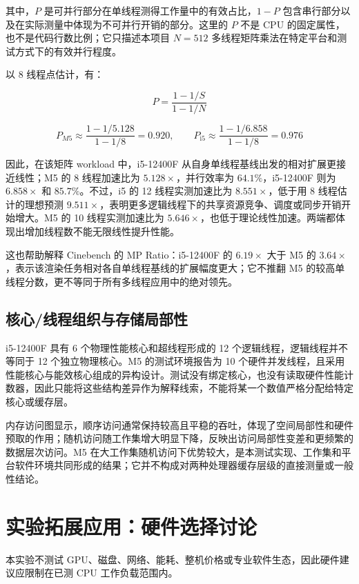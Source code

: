 \documentclass[UTF8,a4paper,12pt]{ctexart}
\begin{document}
其中，$P$ 是可并行部分在单线程测得工作量中的有效占比，$1-P$ 包含串行部分以及在实际测量中体现为不可并行开销的部分。这里的 $P$ 不是 CPU 的固定属性，也不是代码行数比例；它只描述本项目 $N=512$ 多线程矩阵乘法在特定平台和测试方式下的有效并行程度。

以 8 线程点估计，有：

\[
P=\frac{1-1/S}{1-1/N}
\]

\[
P_{M5}\approx\frac{1-1/5.128}{1-1/8}=0.920,
\qquad
P_{\mathrm{i5}}\approx\frac{1-1/6.858}{1-1/8}=0.976
\]

因此，在该矩阵 workload 中，i5-12400F 从自身单线程基线出发的相对扩展更接近线性；M5 的 8 线程加速比为 $5.128\times$，并行效率为 $64.1\%$，i5-12400F 则为 $6.858\times$ 和 $85.7\%$。不过，i5 的 12 线程实测加速比为 $8.551\times$，低于用 8 线程估计的理想预测 $9.511\times$，表明更多逻辑线程下的共享资源竞争、调度或同步开销开始增大。M5 的 10 线程实测加速比为 $5.646\times$，也低于理论线性加速。两端都体现出增加线程数不能无限线性提升性能。

这也帮助解释 Cinebench 的 MP Ratio：i5-12400F 的 $6.19\times$ 大于 M5 的 $3.64\times$，表示该渲染任务相对各自单线程基线的扩展幅度更大；它不推翻 M5 的较高单线程分数，更不等同于所有多线程应用中的绝对领先。

\subsection{核心/线程组织与存储局部性}

i5-12400F 具有 6 个物理性能核心和超线程形成的 12 个逻辑线程，逻辑线程并不等同于 12 个独立物理核心。M5 的测试环境报告为 10 个硬件并发线程，且采用性能核心与能效核心组成的异构设计。测试没有绑定核心，也没有读取硬件性能计数器，因此只能将这些结构差异作为解释线索，不能将某一个数值严格分配给特定核心或缓存层。

内存访问图显示，顺序访问通常保持较高且平稳的吞吐，体现了空间局部性和硬件预取的作用；随机访问随工作集增大明显下降，反映出访问局部性变差和更频繁的数据层次访问。M5 在大工作集随机访问下优势较大，是本测试实现、工作集和平台软件环境共同形成的结果；它并不构成对两种处理器缓存层级的直接测量或一般性结论。

\section{实验拓展应用：硬件选择讨论}

本实验不测试 GPU、磁盘、网络、能耗、整机价格或专业软件生态，因此硬件建议应限制在已测 CPU 工作负载范围内。
\end{document}

